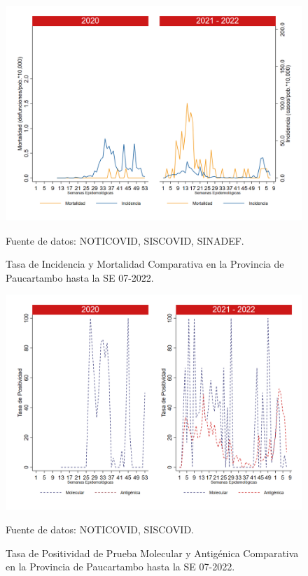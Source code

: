 \documentclass[12pt,a4paper,openany]{book}
\begin{document}
		\begin{figure}[h]
			\caption{Tasa de Incidencia y Mortalidad Comparativa en la Provincia de Paucartambo hasta la SE 07-2022.}\label{fig:inc_mort_paucartam}
			\begin{center}
				\includegraphics[width=0.7\linewidth]{../figuras/incidencia_mortalidad_20_21_11.png}
			\end{center}
			{\footnotesize {Fuente de datos: NOTICOVID, SISCOVID, SINADEF.}}
		\end{figure}
		
		\begin{figure}[h]
			\caption{Tasa de Positividad de Prueba Molecular y Antigénica Comparativa en la Provincia de Paucartambo hasta la SE 07-2022.}\label{fig:positividad_paucartam}
			\begin{center}
				\includegraphics[width=0.7\linewidth]{../figuras/positividad_20_21_11.png}
			\end{center}
			{\footnotesize {Fuente de datos: NOTICOVID, SISCOVID.}}
		\end{figure}
		
\end{document}
